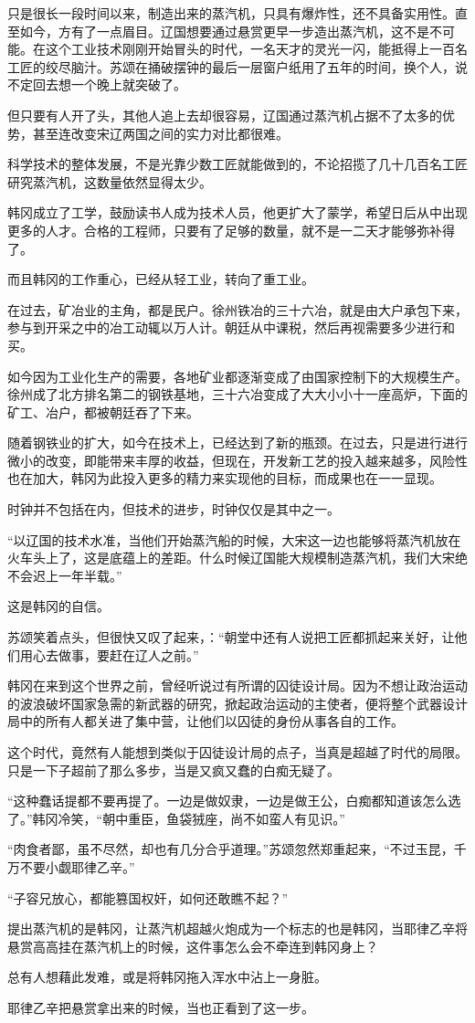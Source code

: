 只是很长一段时间以来，制造出来的蒸汽机，只具有爆炸性，还不具备实用性。直至如今，方有了一点眉目。辽国想要通过悬赏更早一步造出蒸汽机，这不是不可能。在这个工业技术刚刚开始冒头的时代，一名天才的灵光一闪，能抵得上一百名工匠的绞尽脑汁。苏颂在捅破摆钟的最后一层窗户纸用了五年的时间，换个人，说不定回去想一个晚上就突破了。

但只要有人开了头，其他人追上去却很容易，辽国通过蒸汽机占据不了太多的优势，甚至连改变宋辽两国之间的实力对比都很难。

科学技术的整体发展，不是光靠少数工匠就能做到的，不论招揽了几十几百名工匠研究蒸汽机，这数量依然显得太少。

韩冈成立了工学，鼓励读书人成为技术人员，他更扩大了蒙学，希望日后从中出现更多的人才。合格的工程师，只要有了足够的数量，就不是一二天才能够弥补得了。

而且韩冈的工作重心，已经从轻工业，转向了重工业。

在过去，矿冶业的主角，都是民户。徐州铁冶的三十六冶，就是由大户承包下来，参与到开采之中的冶工动辄以万人计。朝廷从中课税，然后再视需要多少进行和买。

如今因为工业化生产的需要，各地矿业都逐渐变成了由国家控制下的大规模生产。徐州成了北方排名第二的钢铁基地，三十六冶变成了大大小小十一座高炉，下面的矿工、冶户，都被朝廷吞了下来。

随着钢铁业的扩大，如今在技术上，已经达到了新的瓶颈。在过去，只是进行进行微小的改变，即能带来丰厚的收益，但现在，开发新工艺的投入越来越多，风险性也在加大，韩冈为此投入更多的精力来实现他的目标，而成果也在一一显现。

时钟并不包括在内，但技术的进步，时钟仅仅是其中之一。

“以辽国的技术水准，当他们开始蒸汽船的时候，大宋这一边也能够将蒸汽机放在火车头上了，这是底蕴上的差距。什么时候辽国能大规模制造蒸汽机，我们大宋绝不会迟上一年半载。”

这是韩冈的自信。

苏颂笑着点头，但很快又叹了起来，：“朝堂中还有人说把工匠都抓起来关好，让他们用心去做事，要赶在辽人之前。”

韩冈在来到这个世界之前，曾经听说过有所谓的囚徒设计局。因为不想让政治运动的波浪破坏国家急需的新武器的研究，掀起政治运动的主使者，便将整个武器设计局中的所有人都关进了集中营，让他们以囚徒的身份从事各自的工作。

这个时代，竟然有人能想到类似于囚徒设计局的点子，当真是超越了时代的局限。只是一下子超前了那么多步，当是又疯又蠢的白痴无疑了。

“这种蠢话提都不要再提了。一边是做奴隶，一边是做王公，白痴都知道该怎么选了。”韩冈冷笑，“朝中重臣，鱼袋狨座，尚不如蛮人有见识。”

“肉食者鄙，虽不尽然，却也有几分合乎道理。”苏颂忽然郑重起来，“不过玉昆，千万不要小觑耶律乙辛。”

“子容兄放心，都能篡国权奸，如何还敢瞧不起？”

提出蒸汽机的是韩冈，让蒸汽机超越火炮成为一个标志的也是韩冈，当耶律乙辛将悬赏高高挂在蒸汽机上的时候，这件事怎么会不牵连到韩冈身上？

总有人想藉此发难，或是将韩冈拖入浑水中沾上一身脏。

耶律乙辛把悬赏拿出来的时候，当也正看到了这一步。
